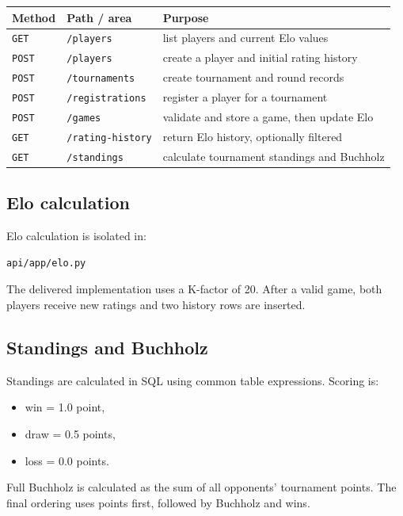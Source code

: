 \documentclass[11pt,a4paper]{article}
\begin{document}
\renewcommand{\arraystretch}{1.2}
\begin{tabularx}{\linewidth}{@{}p{1.6cm}p{4.7cm}X@{}}
\toprule
\textbf{Method} & \textbf{Path / area} & \textbf{Purpose} \\
\midrule
\texttt{GET} & \texttt{/players} & list players and current Elo values \\
\texttt{POST} & \texttt{/players} & create a player and initial rating history \\
\texttt{POST} & \texttt{/tournaments} & create tournament and round records \\
\texttt{POST} & \texttt{/registrations} & register a player for a tournament \\
\texttt{POST} & \texttt{/games} & validate and store a game, then update Elo \\
\texttt{GET} & \texttt{/rating-history} & return Elo history, optionally filtered \\
\texttt{GET} & \texttt{/standings} & calculate tournament standings and Buchholz \\
\bottomrule
\end{tabularx}

\subsection{Elo calculation}

Elo calculation is isolated in:

\begin{verbatim}
api/app/elo.py
\end{verbatim}

The delivered implementation uses a K-factor of 20. After a valid game, both
players receive new ratings and two history rows are inserted.

\subsection{Standings and Buchholz}

Standings are calculated in SQL using common table expressions. Scoring is:

\begin{itemize}[leftmargin=1.4em]
  \item win = 1.0 point,
  \item draw = 0.5 points,
  \item loss = 0.0 points.
\end{itemize}

Full Buchholz is calculated as the sum of all opponents' tournament points.
The final ordering uses points first, followed by Buchholz and wins.
\end{document}
